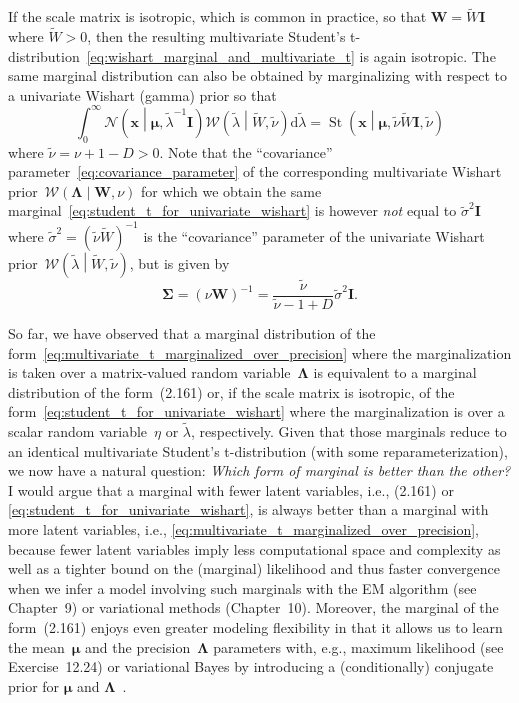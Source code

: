 \documentclass[12pt,a4paper]{article}
\begin{document}
If the scale matrix is isotropic, which is common in practice,
so that $\mathbf{W} = \widetilde{W}\mathbf{I}$ where $\widetilde{W} > 0$, then the resulting
multivariate Student's t-distribution~\eqref{eq:wishart_marginal_and_multivariate_t}
is again isotropic.
The same marginal distribution can also be obtained by marginalizing
with respect to a univariate Wishart (gamma) prior so that
\begin{equation}
\int_{0}^{\infty}
\mathcal{N}\left(\mathbf{x}\middle|\bm{\mu}, \widetilde{\lambda}^{-1}\mathbf{I}\right)
\mathcal{W}\left(\widetilde{\lambda}\middle|\widetilde{W}, \widetilde{\nu}\right)
\mathrm{d}\widetilde{\lambda}
= \operatorname{St}\left(\mathbf{x} \middle|
\bm{\mu}, \widetilde{\nu} \widetilde{W} \mathbf{I}, \widetilde{\nu} \right)
\label{eq:student_t_for_univariate_wishart}
\end{equation}
where $\widetilde{\nu} = \nu + 1 - D > 0$.
Note that the ``covariance'' parameter~\eqref{eq:covariance_parameter} of
the corresponding multivariate
Wishart prior~$\mathcal{W}\left(\bm{\Lambda}\middle|\mathbf{W}, \nu\right)$
for which we obtain the same marginal~\eqref{eq:student_t_for_univariate_wishart}
is however \emph{not} equal to $\widetilde{\sigma}^{2} \mathbf{I}$
where $\widetilde{\sigma}^{2} = \left(\widetilde{\nu}\widetilde{W}\right)^{-1}$ is
the ``covariance'' parameter of the univariate Wishart
prior~$\mathcal{W}\left(\widetilde{\lambda}\middle|\widetilde{W}, \widetilde{\nu}\right)$,
but is given by
\begin{equation}
\bm{\Sigma} = \left(\nu\mathbf{W}\right)^{-1} =
\frac{\widetilde{\nu}}{\widetilde{\nu} - 1 + D} \widetilde{\sigma}^{2} \mathbf{I} .
\end{equation}

So far, we have observed that a marginal
distribution of the form~\eqref{eq:multivariate_t_marginalized_over_precision}
where the marginalization is taken over a matrix-valued random variable~$\bm{\Lambda}$ is
equivalent to a marginal distribution of the form~(2.161) or, if the scale matrix is isotropic,
of the form~\eqref{eq:student_t_for_univariate_wishart} where the marginalization is over
a scalar random variable~$\eta$ or $\widetilde{\lambda}$, respectively.
Given that those marginals reduce to an identical multivariate Student's t-distribution
(with some reparameterization),
we now have a natural question: \emph{Which form of marginal is better than the other?}
I would argue that a marginal with fewer latent variables,
i.e., (2.161) or \eqref{eq:student_t_for_univariate_wishart},
is always better than a marginal with more latent variables,
i.e., \eqref{eq:multivariate_t_marginalized_over_precision},
because fewer latent variables imply less computational space and complexity as well as
a tighter bound on the (marginal) likelihood and thus faster convergence
when we infer a model involving such marginals with the EM algorithm (see Chapter~9) or
variational methods (Chapter~10).
Moreover, the marginal of the form~(2.161) enjoys even greater modeling flexibility in that
it allows us to learn the mean~$\bm{\mu}$ and the precision~$\bm{\Lambda}$ parameters
with, e.g., maximum likelihood (see Exercise~12.24) or
variational Bayes by introducing a (conditionally) conjugate prior for
$\bm{\mu}$ and $\bm{\Lambda}$~\citep{Svensen:RobustMixture}.
\end{document}
